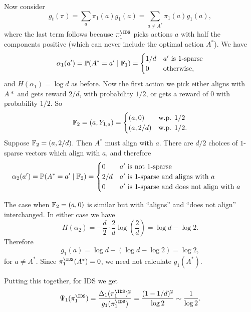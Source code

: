 \documentclass[11pt, openany]{book}
\begin{document}
\begin{example}
\begin{itemize}
\begin{itemize}
            Now consider
            \[
                g_t(\pi) = \sum_a \pi_1(a) g_1(a) = \sum_{a\neq A^*} \pi_1(a) g_1(a),
            \]
            where the last term follows because $\pi_1^{\IDS}$ picks actions $a$ with half the components positive (which can never include the optimal action $A^*$). We have
            \[
                \alpha_1(a') = \mathbb{P}(A^* = a' \mid \mathbb{F}_1) = \begin{cases}
                    1/d & \text{$a'$ is $1$-sparse} \\
                    0 & \text{otherwise},
                \end{cases}
            \]
            and $H(\alpha_1) = \log d$ as before. Now the first action we pick either aligns with $A*$ and gets reward $2/d$, with probability $1/2$, or gets a reward of $0$ with probability $1/2$. So
            \[
                \mathbb{F}_2 = (a,Y_{1,a}) = \begin{cases}
                    (a,0) & \text{w.p. $1/2$} \\
                    (a,2/d) & \text{w.p. $1/2$}.
                \end{cases}
            \]
            Suppose $\mathbb{F}_2 = (a,2/d)$. Then $A^*$ must align with $a$. There are $d/2$ choices of $1$-sparse vectors which align with $a$, and therefore
            \begin{align*}
                \alpha_2(a') & = \mathbb{P}(A^*=a'\mid \mathbb{F}_2) = \begin{cases}
                    0 & \text{$a'$ is not $1$-sparse} \\
                    2/d & \text{$a'$ is $1$-sparse and aligns with $a$} \\
                    0 & \text{$a'$ is $1$-sparse and does not align with $a$}
                \end{cases}
            \end{align*}

            The case when $\mathbb{F}_2 = (a,0)$ is similar but with ``aligns'' and ``does not align'' interchanged. In either case we have
            \[
                H(\alpha_2) = -\frac{d}{2}\cdot \frac{2}{d} \log\left(\frac{2}{d}\right) = \log d - \log 2.
            \]
            Therefore
            \[
                g_1(a) = \log d - (\log d - \log 2) = \log 2,
            \]
            for $a\neq A^*$. Since $\pi_1^{\IDS}(A^*)=0$, we need not calculate $g_1(A^*)$.

            Putting this together, for IDS we get
            \[
                \Psi_1(\pi_1^{\IDS}) = \frac{\Delta_1(\pi_1^{\IDS})^2}{g_1(\pi_1^{\IDS})} = \frac{(1-1/d)^2}{\log 2} \sim \frac{1}{\log 2}.
            \]



    \end{itemize}
    \end{itemize}
\end{example}
\end{document}
